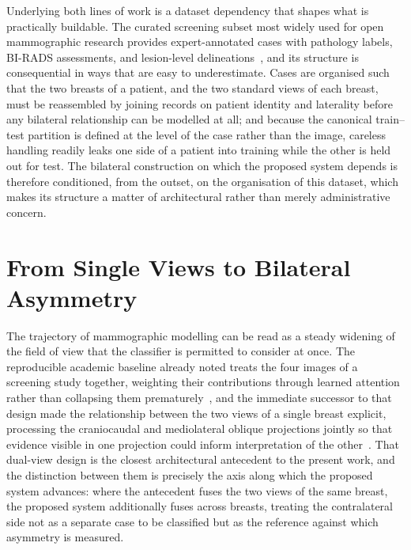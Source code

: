 \documentclass[12pt, a4paper]{article}
\begin{document}
Underlying both lines of work is a dataset dependency that shapes what is
practically buildable. The curated screening subset most widely used for
open mammographic research provides expert-annotated cases with pathology
labels, BI-RADS assessments, and lesion-level
delineations~\cite{Lee2017}, and its structure is consequential in ways
that are easy to underestimate. Cases are organised such that the two
breasts of a patient, and the two standard views of each breast, must be
reassembled by joining records on patient identity and laterality before
any bilateral relationship can be modelled at all; and because the
canonical train--test partition is defined at the level of the case rather
than the image, careless handling readily leaks one side of a patient into
training while the other is held out for test. The bilateral construction
on which the proposed system depends is therefore conditioned, from the
outset, on the organisation of this dataset, which makes its structure a
matter of architectural rather than merely administrative concern.

\section{From Single Views to Bilateral Asymmetry}

The trajectory of mammographic modelling can be read as a steady widening of
the field of view that the classifier is permitted to consider at once. The
reproducible academic baseline already noted treats the four images of a
screening study together, weighting their contributions through learned
attention rather than collapsing them prematurely~\cite{Wu2019}, and the
immediate successor to that design made the relationship between the two
views of a single breast explicit, processing the craniocaudal and
mediolateral oblique projections jointly so that evidence visible in one
projection could inform interpretation of the other~\cite{Wu2020}. That
dual-view design is the closest architectural antecedent to the present
work, and the distinction between them is precisely the axis along which
the proposed system advances: where the antecedent fuses the two views of
the same breast, the proposed system additionally fuses across breasts,
treating the contralateral side not as a separate case to be classified but
as the reference against which asymmetry is measured.
\end{document}
